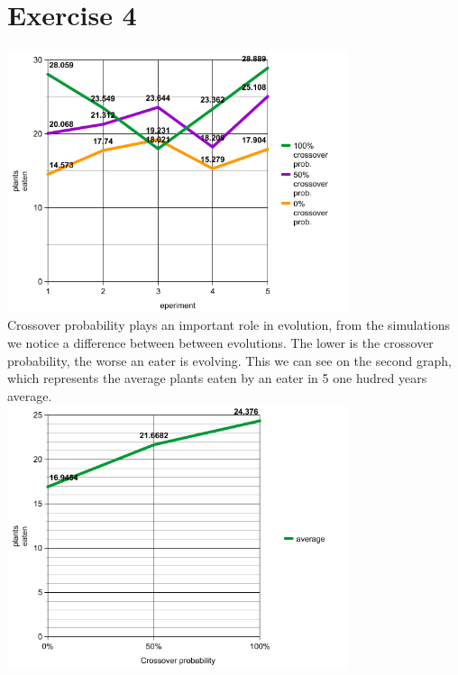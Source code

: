 \documentclass[a4paper,10pt]{article}
\begin{document}
\section*{Exercise 4}
\includegraphics[width=10cm]{graph.png}\\
Crossover probability plays an important role in evolution, from the simulations we notice a difference between
between evolutions. The lower is the crossover probability, the worse an eater is evolving. This we can see on
the second graph, which represents the average plants eaten by an eater in 5 one hudred years average.\\
\includegraphics[width=10cm]{graph4.png}\\
\end{document}
